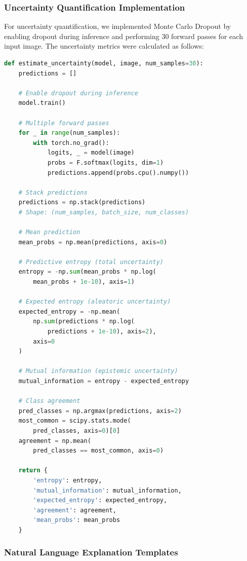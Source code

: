 \subsubsection{Uncertainty Quantification Implementation}

For uncertainty quantification, we implemented Monte Carlo Dropout by enabling dropout during inference and performing 30 forward passes for each input image. The uncertainty metrics were calculated as follows:

\begin{lstlisting}[language=Python, caption=Uncertainty estimation with Monte Carlo Dropout, label=lst:mc-dropout, basicstyle=\footnotesize\ttfamily, breaklines=true]
def estimate_uncertainty(model, image, num_samples=30):
    predictions = []
    
    # Enable dropout during inference
    model.train()
    
    # Multiple forward passes
    for _ in range(num_samples):
        with torch.no_grad():
            logits, _ = model(image)
            probs = F.softmax(logits, dim=1)
            predictions.append(probs.cpu().numpy())
    
    # Stack predictions
    predictions = np.stack(predictions)
    # Shape: (num_samples, batch_size, num_classes)
    
    # Mean prediction
    mean_probs = np.mean(predictions, axis=0)
    
    # Predictive entropy (total uncertainty)
    entropy = -np.sum(mean_probs * np.log(
        mean_probs + 1e-10), axis=1)
    
    # Expected entropy (aleatoric uncertainty)
    expected_entropy = -np.mean(
        np.sum(predictions * np.log(
            predictions + 1e-10), axis=2),
        axis=0
    )
    
    # Mutual information (epistemic uncertainty)
    mutual_information = entropy - expected_entropy
    
    # Class agreement
    pred_classes = np.argmax(predictions, axis=2)
    most_common = scipy.stats.mode(
        pred_classes, axis=0)[0]
    agreement = np.mean(
        pred_classes == most_common, axis=0)
    
    return {
        'entropy': entropy,
        'mutual_information': mutual_information,
        'expected_entropy': expected_entropy,
        'agreement': agreement,
        'mean_probs': mean_probs
    }
\end{lstlisting}

\subsubsection{Natural Language Explanation Templates}

